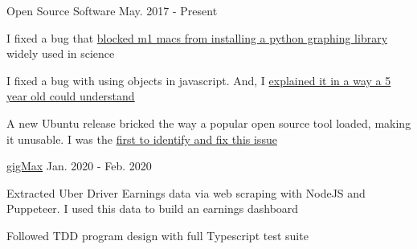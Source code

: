 

\begin{cventries}



  \cventry
    {} %
    {Open Source Software} %
    {} %
    {May. 2017 - Present} %
    {
      \begin{cvitems} %
      \item{I fixed a bug that \href{https://github.com/pygraphviz/pygraphviz/issues/398#issuecomment-10384769210}{blocked m1 macs from installing a python graphing library} widely used in science}
      \item{I fixed a bug with using objects in javascript. And, I \href{https://stackoverflow.com/questions/10107198/javascript-not-a-constructor-exception-while-creating-objects/59180877#59180877}{explained it in a way a 5 year old could understand}}
      \item{A new Ubuntu release bricked the way a popular open source tool loaded, making it unusable. I was the \href{https://askubuntu.com/questions/1242139/youtube-dl-usr-bin-env-python-no-such-file-or-directory/}{first to identify and fix this issue}}
      \end{cvitems}
    }
  \cventry
    {} %
    {\href{https://github.com/geofflangenderfer/gigMax}{gigMax}} %
    {} %
    {Jan. 2020 - Feb. 2020} %
    {
      \begin{cvitems} %
      \item {Extracted Uber Driver Earnings data via web scraping with NodeJS and Puppeteer. I used this data to build an earnings dashboard}
      \item {Followed TDD program design with full Typescript test suite}
      \end{cvitems}
    }

\end{cventries}
